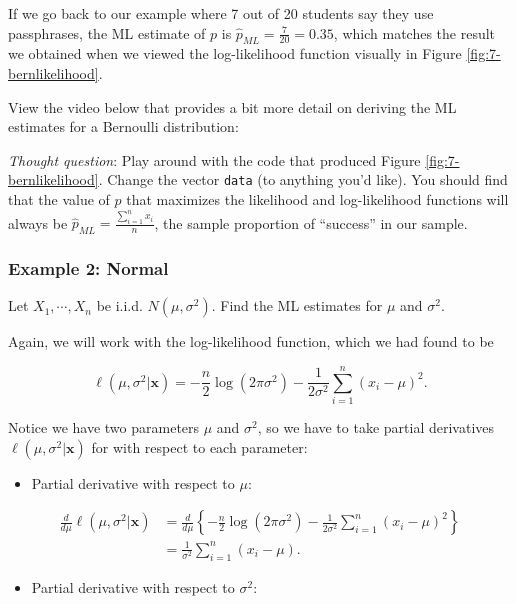 \documentclass[
]{book}
\providecommand{\tightlist}{%
  \setlength{\itemsep}{0pt}\setlength{\parskip}{0pt}}
\begin{document}
If we go back to our example where 7 out of 20 students say they use passphrases, the ML estimate of \(p\) is \(\hat{p}_{ML} = \frac{7}{20} = 0.35\), which matches the result we obtained when we viewed the log-likelihood function visually in Figure \ref{fig:7-bernlikelihood}.

View the video below that provides a bit more detail on deriving the ML estimates for a Bernoulli distribution:

\emph{Thought question}: Play around with the code that produced Figure \ref{fig:7-bernlikelihood}. Change the vector \texttt{data} (to anything you'd like). You should find that the value of \(p\) that maximizes the likelihood and log-likelihood functions will always be \(\hat{p}_{ML} = \frac{\sum_{i=1}^n x_i}{n}\), the sample proportion of ``success'' in our sample.

\subsubsection{Example 2: Normal}\label{example-2-normal-1}

Let \(X_1, \cdots, X_n\) be i.i.d. \(N(\mu, \sigma^2)\). Find the ML estimates for \(\mu\) and \(\sigma^2\).

Again, we will work with the log-likelihood function, which we had found to be

\[
\ell (\mu, \sigma^2 | \boldsymbol{x}) = -\frac{n}{2} \log (2 \pi \sigma^2) - \frac{1}{2 \sigma^2} \sum_{i=1}^n (x_i - \mu)^2.
\]

Notice we have two parameters \(\mu\) and \(\sigma^2\), so we have to take partial derivatives \(\ell (\mu, \sigma^2 | \boldsymbol{x})\) for with respect to each parameter:

\begin{itemize}
\tightlist
\item
  Partial derivative with respect to \(\mu\):
\end{itemize}

\[
\begin{split}
\frac{d}{d \mu}\ell (\mu, \sigma^2 | \boldsymbol{x}) &= \frac{d}{d \mu} \left\{ -\frac{n}{2} \log (2 \pi \sigma^2) - \frac{1}{2 \sigma^2} \sum_{i=1}^n (x_i - \mu)^2 \right \} \\
                                                     &= \frac{1}{\sigma^2} \sum_{i=1}^n (x_i - \mu).
\end{split}
\]

\begin{itemize}
\tightlist
\item
  Partial derivative with respect to \(\sigma^2\):
\end{itemize}
\end{document}
